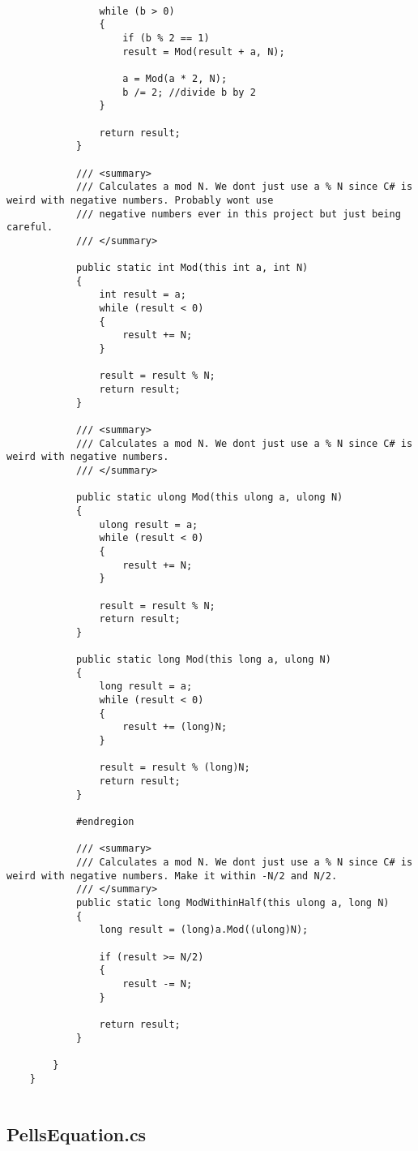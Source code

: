 \documentclass{article}
\begin{document}
\begin{lstlisting}
				
				while (b > 0)
				{
					if (b % 2 == 1)
					result = Mod(result + a, N);
					
					a = Mod(a * 2, N);
					b /= 2; //divide b by 2
				}
				
				return result;
			}
			
			/// <summary>
			/// Calculates a mod N. We dont just use a % N since C# is weird with negative numbers. Probably wont use
			/// negative numbers ever in this project but just being careful.
			/// </summary>
			
			public static int Mod(this int a, int N)
			{
				int result = a;
				while (result < 0)
				{
					result += N;
				}
				
				result = result % N;
				return result;
			}
			
			/// <summary>
			/// Calculates a mod N. We dont just use a % N since C# is weird with negative numbers.
			/// </summary>
			
			public static ulong Mod(this ulong a, ulong N)
			{
				ulong result = a;
				while (result < 0)
				{
					result += N;
				}
				
				result = result % N;
				return result;
			}
			
			public static long Mod(this long a, ulong N)
			{
				long result = a;
				while (result < 0)
				{
					result += (long)N;
				}
				
				result = result % (long)N;
				return result;
			}
			
			#endregion
			
			/// <summary>
			/// Calculates a mod N. We dont just use a % N since C# is weird with negative numbers. Make it within -N/2 and N/2.
			/// </summary>
			public static long ModWithinHalf(this ulong a, long N)
			{
				long result = (long)a.Mod((ulong)N);
				
				if (result >= N/2)
				{
					result -= N;
				}
				
				return result;
			}
			
		}
	}
	
\end{lstlisting}

\subsection{PellsEquation.cs}
\end{document}
